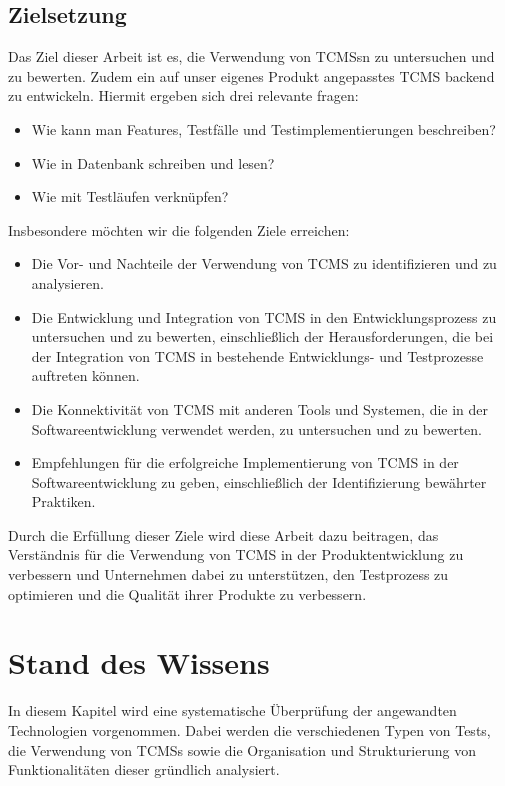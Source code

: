 \documentclass[a4paper, fontsize=11pt, parskip=half, twoside]{scrreprt}
\begin{document}
	\section{Zielsetzung}
	Das Ziel dieser Arbeit ist es, die Verwendung von \aclp{TCMS}n zu untersuchen und zu bewerten. 
	Zudem ein auf unser eigenes Produkt angepasstes \ac{TCMS} backend zu entwickeln. 
	Hiermit ergeben sich drei relevante fragen:
	
	\begin{itemize}
		\item Wie kann man Features, Testfälle und Testimplementierungen beschreiben? 
		\item Wie in Datenbank schreiben und lesen? 
		\item Wie mit Testläufen verknüpfen?
	\end{itemize}
	
	Insbesondere möchten wir die folgenden Ziele erreichen:
	
	\begin{itemize}
		\item Die Vor- und Nachteile der Verwendung von \ac{TCMS} zu identifizieren und zu analysieren.
		\item Die Entwicklung und Integration von \ac{TCMS} in den Entwicklungsprozess zu untersuchen und zu bewerten, einschließlich der Herausforderungen, die bei der Integration von \ac{TCMS} in bestehende Entwicklungs- und Testprozesse auftreten können.
		\item Die Konnektivität von \ac{TCMS} mit anderen Tools und Systemen, die in der Softwareentwicklung verwendet werden, zu untersuchen und zu bewerten.
		\item Empfehlungen für die erfolgreiche Implementierung von \ac{TCMS} in der Softwareentwicklung zu geben, einschließlich der Identifizierung bewährter Praktiken.
	\end{itemize}
	
	Durch die Erfüllung dieser Ziele wird diese Arbeit dazu beitragen, das Verständnis für die Verwendung von \ac{TCMS} in der Produktentwicklung zu verbessern und Unternehmen dabei zu unterstützen, den Testprozess zu optimieren und die Qualität ihrer Produkte zu verbessern.
	
	
	
	\chapter{Stand des Wissens} \label{sec:stateofart}
	In diesem Kapitel wird eine systematische Überprüfung der angewandten Technologien vorgenommen. 
	Dabei werden die verschiedenen Typen von Tests, die Verwendung von \aclp{TCMS} sowie die Organisation und Strukturierung von Funktionalitäten dieser gründlich analysiert.	
	
\end{document}
